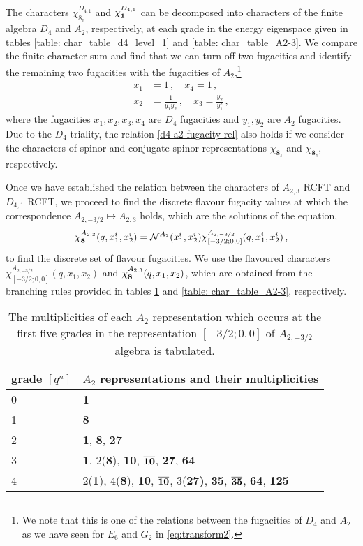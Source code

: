 \documentclass[a4paper,12pt]{article}
\begin{document}
The characters $\chi_{8_v}^{D_{4,1}}$ and $\chi_{\bf 1}^{D_{4,1}}$ can be decomposed into characters of the finite algebra $D_4$ and $A_2$, respectively, at each grade in the energy eigenspace given in tables \ref{table: char_table_d4_level_1} and \ref{table: char_table_A2-3}. We compare the finite character sum and find that we can turn off two fugacities and identify the remaining two fugacities with the fugacities of $A_2$,\footnote{We note that this is one of the relations between the fugacities of $D_4$ and $A_2$ as we have seen for $E_6$ and $G_2$ in \eqref{eq:transform2}.}
\begin{align}\label{d4-a2-fugacity-rel}
    x_1&=1\, ,\quad x_4=1\, ,\nonumber\\
    x_2&=\frac{1}{y_1y_2}\, ,\quad x_3=\frac{y_2}{y_1^2}\, ,
\end{align}
where the fugacities $x_1,x_2,x_3,x_4$ are $D_4$ fugacities and $y_1,y_2$ are $A_2$ fugacities. Due to the $D_4$ triality, the relation \eqref{d4-a2-fugacity-rel} also holds if we consider the characters of spinor and conjugate spinor representations $\chi_{\mathbf{8}_s}$ and $\chi_{\mathbf{8}_c}$, respectively.

Once we have established the relation between the characters of $A_{2,3}$ RCFT and $D_{4,1}$ RCFT, we proceed to find the discrete flavour fugacity values at which the correspondence $A_{2,-3/2}\mapsto A_{2,3}$ holds, which are the solutions of the equation,
%
\begin{equation}\label{fugacity_match-ansatz_a2}
    \chi^{A_{2,3}}_{\bf 8}(q,x_1^i,x_2^i)=\mathcal{N}^{A_{2}}(x_1^i,x_2^i)\chi^{A_{2,-3/2}}_{[-3/2;0,0]}(q,x_1^i,x_2^i)\, ,
\end{equation}
%
to find the discrete set of flavour fugacities. We use the flavoured characters $\chi^{A_{2,-3/2}}_{[-3/2;0,0]}(q,x_1,x_2)$ and $\chi^{A_{2,3}}_{\bf 8}(q,x_1,x_2)$, which are obtained from the branching rules provided in tables \ref{table: char_table_A2-32} and \ref{table: char_table_A2-3}, respectively.
%
\begin{table}
\centering
\begin{tabular}{ |p{2cm}|p{8cm}|  }
\hline
grade $[q^n]$ & $A_2$ representations and their multiplicities \cite{Buican:2015ina}\\
\hline
0 & {\bf 1} \\
\hline
1 & {\bf 8} \\
\hline
2 & {\bf 1}, {\bf 8}, {\bf 27}\\
\hline
3 & {\bf 1}, 2({\bf 8}), {\bf 10}, {$\overline{\bf 10}$}, {\bf 27}, {\bf 64}\\
\hline
4 & 2({\bf 1}), 4({\bf 8}), {\bf 10}, {$\overline{\bf 10}$}, 3{(\bf 27)}, {\bf 35}, {$\overline{\bf 35}$}, {\bf 64}, {\bf 125}\\
\hline
\end{tabular}
\caption{The multiplicities of each $A_2$ representation which occurs at the first five grades in the representation $[-3/2;0,0]$ of $A_{2,-3/2}$ algebra is tabulated.}
\label{table: char_table_A2-32}
\end{table} 
\end{document}
